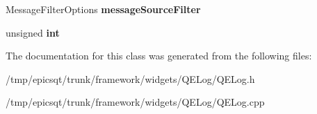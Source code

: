 \begin{DoxyCompactItemize}
\item 
\hypertarget{classQELog_abcc2581abd947c209d4f86ad3bd7c720}{
MessageFilterOptions {\bfseries messageSourceFilter}}
\label{classQELog_abcc2581abd947c209d4f86ad3bd7c720}

\item 
\hypertarget{classQELog_a7e7692c580904d7dc097d9eff3dd071c}{
unsigned {\bfseries int}}
\label{classQELog_a7e7692c580904d7dc097d9eff3dd071c}

\end{DoxyCompactItemize}


The documentation for this class was generated from the following files:\begin{DoxyCompactItemize}
\item 
/tmp/epicsqt/trunk/framework/widgets/QELog/QELog.h\item 
/tmp/epicsqt/trunk/framework/widgets/QELog/QELog.cpp\end{DoxyCompactItemize}
